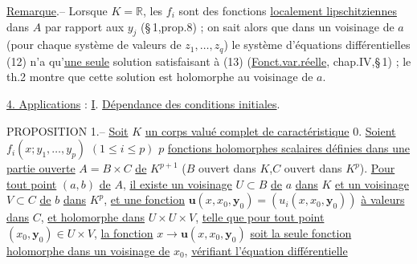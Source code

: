 \uline{Remarque}.-- Lorsque $K=\mathbb R$, les $f_i$ sont des fonctions \uline{localement lipschitziennes} dans $A$ par rapport aux $y_j$ (\S\,1,prop.8) ; on sait alors que dans un voisinage de $a$ (pour chaque système de valeurs de $z_1,\ldots,z_q$) le système d'équations différentielles (12) n'a qu'\uline{une seule} solution satisfaisant à (13) (\uline{Fonct.var.réelle}, chap.IV,\S\,1) ; le th.2 montre que cette solution est holomorphe au voisinage de $a$.

\uline{4. Applications} : \uline{I}. \uline{Dépendance des conditions initiales}.

PROPOSITION 1.-- \uline{Soit} $K$ \uline{un corps valué complet de caractéristique} $0$.
\uline{Soient} $f_i(x;y_1,\ldots,y_p)$ $(1\leq i\leq p)$ $p$ \uline{fonctions holomorphes scalaires définies dans une partie ouverte}
$A=B\times C$ \uline{de} $K^{p+1}$ ($B$ ouvert dans $K$,$C$ ouvert dans $K^p$).
\uline{Pour tout point} $(a,b)$ \uline{de} $A$, \uline{il existe un voisinage} $U\subset B$ \uline{de} $a$ \uline{dans} $K$ \uline{et un voisinage} $V\subset C$ \uline{de} $b$ \uline{dans} $K^p$, \uline{et une fonction} $\mathbf{u}(x,x_0,\mathbf{y}_0)=(u_i(x,x_0,\mathbf{y}_0))$ \uline{à valeurs dans} $C$, \uline{et holomorphe dans} $U\times U\times V$, \uline{telle que pour tout point} $(x_0,\mathbf{y}_0)\in U\times V$, \uline{la fonction}
$x\longrightarrow \mathbf{u}(x,x_0,\mathbf{y}_0)$ \uline{soit la seule fonction holomorphe dans un voisinage de} $x_0$, \uline{vérifiant l'équation différentielle}


